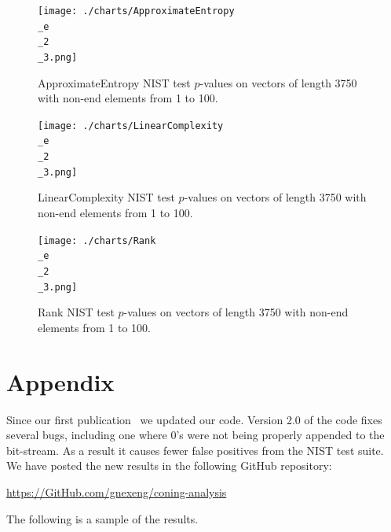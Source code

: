 \documentclass[oneside,12pt]{amsart}
\theoremstyle{definition}
\numberwithin{equation}{section}
\begin{document}
\begin{figure}[h!]
\centering
\caption{ApproximateEntropy NIST test $p$-values on vectors of length 3750 with non-end elements from 1 to 100.}
\texttt{[image: ./charts/ApproximateEntropy\\\_e\\\_2\\\_3.png]}
\label{fig:approxentropy23}
\end{figure}


\begin{figure}[h!]
\centering
\caption{LinearComplexity NIST test $p$-values on vectors of length 3750 with non-end elements from 1 to 100.}
\texttt{[image: ./charts/LinearComplexity\\\_e\\\_2\\\_3.png]}
\label{fig:linearcomplexity23}
\end{figure}

\begin{figure}[h!]
\centering
\caption{Rank NIST test $p$-values on vectors of length 3750 with non-end elements from 1 to 100.}
\texttt{[image: ./charts/Rank\\\_e\\\_2\\\_3.png]}
\label{fig:rank23}
\end{figure}



\clearpage
\section{Appendix} \label{appendix}


Since our first publication~\cite{ALDH} we updated our code. Version 2.0 of the code fixes several bugs, including one where 0's were not being properly appended to the bit-stream. As a result it causes fewer false positives from the NIST test suite. We have posted the new results in the following GitHub repository:
\begin{center}
\url{https://GitHub.com/gnexeng/coning-analysis}
\end{center}
The following is a sample of the results.
\end{document}
